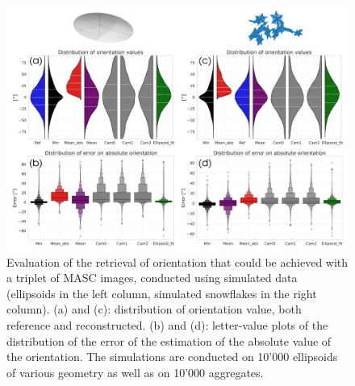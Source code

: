 \documentclass[draft]{agujournal2019}
\begin{document}
\begin{figure}
 \noindent \centering \includegraphics[width=\textwidth]{Fig02.png}
\caption{Evaluation of the retrieval of orientation that could be achieved with a triplet of MASC images, conducted using simulated data (ellipsoids in the left column, simulated snowflakes in the right column). (a) and (c): distribution of orientation value, both reference and reconstructed. (b) and (d): letter-value plots of the distribution of the error of the estimation of the absolute value of the orientation. The simulations are conducted on 10'000 ellipsoids of various geometry as well as on 10'000 aggregates. }
\label{fig:simulations}
\end{figure}
\end{document}
